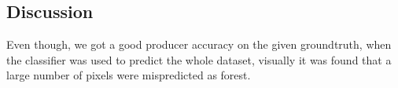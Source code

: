 
\subsection{Discussion}
Even though, we got a good producer accuracy on the given groundtruth, when the classifier was used to predict the whole dataset, visually it was found that a large number of pixels were mispredicted as forest. 
